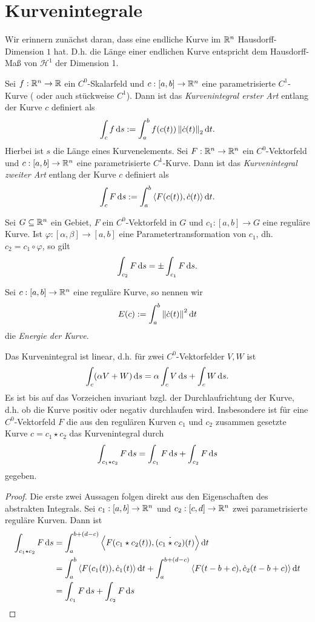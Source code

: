 \documentclass[
pdftex,
oneside,
headsepline,
11pt, 
]{scrreprt}
\begin{document}
\section{Kurvenintegrale}
Wir erinnern zunächst daran, dass eine endliche Kurve im $\mathbb{R}^n$  Hausdorff-Dimension $1$ hat. D.h. die Länge einer endlichen Kurve  entspricht dem Hausdorff-Maß von $\mathcal{H}^1$ der Dimension 1.
\begin{de}[Kurvenintegral]
	Sei $f:\mathbb{R}^n\to \mathbb{R}$ ein $C^0$-Skalarfeld und $c:[a,b]\to \mathbb{R}^n$ eine parametrisierte $C^1$-Kurve ( oder auch stückweise $C^1$). Dann ist das \textit{Kurvenintegral erster Art} entlang der Kurve $c$ definiert als \[  \int_c f \mathop{}\!\mathrm{d} s:=\int_a^b f(c(t))\left\lVert\dot{c}(t)\right\rVert_2\mathop{}\!\mathrm{d} t. \] Hierbei  ist $s$ die Länge eines Kurvenelements. Sei $F:\mathbb{R}^n\to \mathbb{R}^n$ ein $C^0$-Vektorfeld und $c:[a,b]\to \mathbb{R}^n$ eine parametrisierte $C^1$-Kurve. Dann ist das \textit{Kurvenintegral zweiter Art} entlang der Kurve $c$ definiert als \[ \int_{c} F \mathop{}\!\mathrm{d} s:= \int_a^b \left\langle F(c(t)),\dot{c}(t) \right\rangle\mathop{}\!\mathrm{d} t. \]
\end{de}
\begin{lem}
	Sei $G\subseteq \mathbb{R}^n$ ein Gebiet, $F$ ein $C^0$-Vektorfeld in $G$ und $c_1:[a,b]\to G$ eine reguläre Kurve. Ist $\varphi:[\alpha,\beta]\to[a,b]$ eine Parametertransformation von $c_1$, dh. $c_2=c_1\circ\varphi$, so gilt \[  \int_{c_2} F \mathop{}\!\mathrm{d} s = \pm \int_{c_1}F\mathop{}\!\mathrm{d} s . \]
\end{lem}
\begin{bsp}
	
\end{bsp}
\begin{de}
	Sei $c:[a,b]\to \mathbb{R}^n$ eine reguläre Kurve, so nennen wir
	\[ E(c):=\int_a^b\left\lVert\dot{c}(t)\right\rVert^2\mathop{}\!\mathrm{d} t \] die \textit{Energie der Kurve}.
\end{de}
\begin{lem}
	Das Kurvenintegral ist linear, d.h. für zwei $C^0$-Vektorfelder $V,W$ ist \[ \int_c (\alpha V + W)\mathop{}\!\mathrm{d} s=\alpha \int_c V \mathop{}\!\mathrm{d} s+\int_c W\mathop{}\!\mathrm{d} s. \]  Es ist bis auf das Vorzeichen invariant bzgl. der Durchlaufrichtung der Kurve,  d.h. ob die Kurve positiv oder negativ durchlaufen wird. Insbesondere ist für eine $C^0$-Vektorfeld $F$ die aus den regulären Kurven $c_1$ und $c_2$ zusammen gesetzte Kurve $c=c_1\star c_2$ das Kurvenintegral durch \[  \int_{c_1\star c_2} F \mathop{}\!\mathrm{d} s=\int_{c_1}F\mathop{}\!\mathrm{d} s+\int_{c_2}F \mathop{}\!\mathrm{d} s \] gegeben.
\end{lem}
\begin{proof}
	Die erste zwei Aussagen folgen direkt aus den Eigenschaften des abstrakten Integrals. Sei $c_1:[a,b]\to \mathbb{R}^n$ und $c_2:[c,d]\to \mathbb{R}^n$ zwei parametrisierte reguläre Kurven. Dann ist  \begin{align*}
	\int_{c_1\star c_2}F \mathop{}\!\mathrm{d} s &= \int_a^{b+(d-c)} \left\langle F(c_1\star c_2(t)),\dot{(c_1\star c_2)}(t) \right\rangle\mathop{}\!\mathrm{d} t\\
	&=\int_a^b\left\langle F(c_1(t)),\dot{c}_1(t) \right\rangle\mathop{}\!\mathrm{d} t + \int_a^{b+(d-c)}\left\langle F(t-b+c),\dot{c}_2(t-b+c) \right\rangle\mathop{}\!\mathrm{d} t\\
	&=\int_{c_1}F\mathop{}\!\mathrm{d} s+\int_{c_2}F \mathop{}\!\mathrm{d} s
	\end{align*}
\end{proof}
\end{document}
